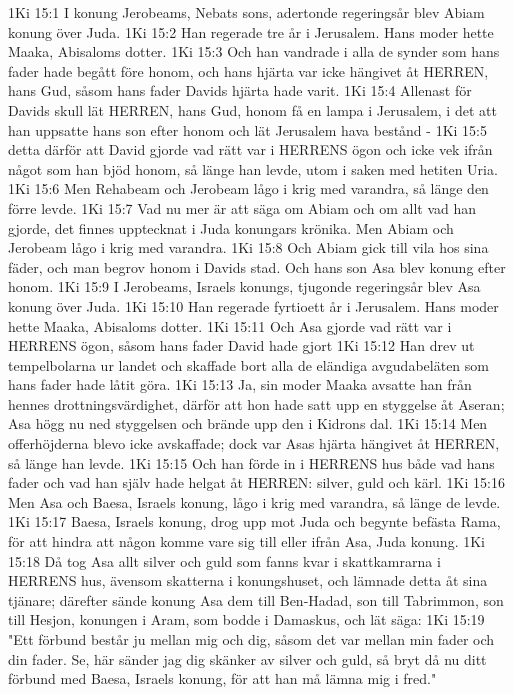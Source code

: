 1Ki 15:1  I konung Jerobeams, Nebats sons, adertonde regeringsår blev Abiam konung över Juda.
1Ki 15:2  Han regerade tre år i Jerusalem. Hans moder hette Maaka, Abisaloms dotter.
1Ki 15:3  Och han vandrade i alla de synder som hans fader hade begått före honom, och hans hjärta var icke hängivet åt HERREN, hans Gud, såsom hans fader Davids hjärta hade varit.
1Ki 15:4  Allenast för Davids skull lät HERREN, hans Gud, honom få en lampa i Jerusalem, i det att han uppsatte hans son efter honom och lät Jerusalem hava bestånd -
1Ki 15:5  detta därför att David gjorde vad rätt var i HERRENS ögon och icke vek ifrån något som han bjöd honom, så länge han levde, utom i saken med hetiten Uria.
1Ki 15:6  Men Rehabeam och Jerobeam lågo i krig med varandra, så länge den förre levde.
1Ki 15:7  Vad nu mer är att säga om Abiam och om allt vad han gjorde, det finnes upptecknat i Juda konungars krönika. Men Abiam och Jerobeam lågo i krig med varandra.
1Ki 15:8  Och Abiam gick till vila hos sina fäder, och man begrov honom i Davids stad. Och hans son Asa blev konung efter honom.
1Ki 15:9  I Jerobeams, Israels konungs, tjugonde regeringsår blev Asa konung över Juda.
1Ki 15:10  Han regerade fyrtioett år i Jerusalem. Hans moder hette Maaka, Abisaloms dotter.
1Ki 15:11  Och Asa gjorde vad rätt var i HERRENS ögon, såsom hans fader David hade gjort
1Ki 15:12  Han drev ut tempelbolarna ur landet och skaffade bort alla de eländiga avgudabeläten som hans fader hade låtit göra.
1Ki 15:13  Ja, sin moder Maaka avsatte han från hennes drottningsvärdighet, därför att hon hade satt upp en styggelse åt Aseran; Asa högg nu ned styggelsen och brände upp den i Kidrons dal.
1Ki 15:14  Men offerhöjderna blevo icke avskaffade; dock var Asas hjärta hängivet åt HERREN, så länge han levde.
1Ki 15:15  Och han förde in i HERRENS hus både vad hans fader och vad han själv hade helgat åt HERREN: silver, guld och kärl.
1Ki 15:16  Men Asa och Baesa, Israels konung, lågo i krig med varandra, så länge de levde.
1Ki 15:17  Baesa, Israels konung, drog upp mot Juda och begynte befästa Rama, för att hindra att någon komme vare sig till eller ifrån Asa, Juda konung.
1Ki 15:18  Då tog Asa allt silver och guld som fanns kvar i skattkamrarna i HERRENS hus, ävensom skatterna i konungshuset, och lämnade detta åt sina tjänare; därefter sände konung Asa dem till Ben-Hadad, son till Tabrimmon, son till Hesjon, konungen i Aram, som bodde i Damaskus, och lät säga:
1Ki 15:19  "Ett förbund består ju mellan mig och dig, såsom det var mellan min fader och din fader. Se, här sänder jag dig skänker av silver och guld, så bryt då nu ditt förbund med Baesa, Israels konung, för att han må lämna mig i fred."
